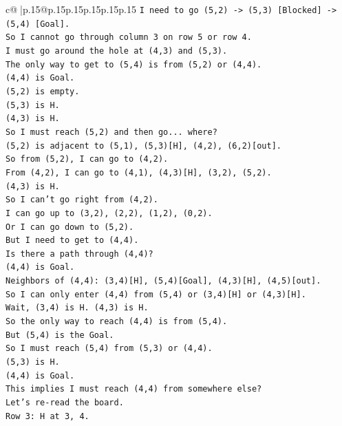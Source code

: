 \documentclass{article}
\begin{document}
{\begin{supertabular}{c@{$\;$}|p{.15\linewidth}@{}p{.15\linewidth}p{.15\linewidth}p{.15\linewidth}p{.15\linewidth}p{.15\linewidth}}
{{{\texttt{I need to go (5,2) {-}> (5,3) {[}Blocked{]} {-}> (5,4) {[}Goal{]}.} \\
\texttt{So I cannot go through column 3 on row 5 or row 4.} \\
\texttt{I must go around the hole at (4,3) and (5,3).} \\
\texttt{The only way to get to (5,4) is from (5,2) or (4,4).} \\
\texttt{(4,4) is Goal.} \\
\texttt{(5,2) is empty.} \\
\texttt{(5,3) is H.} \\
\texttt{(4,3) is H.} \\
\texttt{So I must reach (5,2) and then go... where?} \\
\texttt{(5,2) is adjacent to (5,1), (5,3){[}H{]}, (4,2), (6,2){[}out{]}.} \\
\texttt{So from (5,2), I can go to (4,2).} \\
\texttt{From (4,2), I can go to (4,1), (4,3){[}H{]}, (3,2), (5,2).} \\
\texttt{(4,3) is H.} \\
\texttt{So I can't go right from (4,2).} \\
\texttt{I can go up to (3,2), (2,2), (1,2), (0,2).} \\
\texttt{Or I can go down to (5,2).} \\
\texttt{But I need to get to (4,4).} \\
\texttt{Is there a path through (4,4)?} \\
\texttt{(4,4) is Goal.} \\
\texttt{Neighbors of (4,4): (3,4){[}H{]}, (5,4){[}Goal{]}, (4,3){[}H{]}, (4,5){[}out{]}.} \\
\texttt{So I can only enter (4,4) from (5,4) or (3,4){[}H{]} or (4,3){[}H{]}.} \\
\texttt{Wait, (3,4) is H. (4,3) is H.} \\
\texttt{So the only way to reach (4,4) is from (5,4).} \\
\texttt{But (5,4) is the Goal.} \\
\texttt{So I must reach (5,4) from (5,3) or (4,4).} \\
\texttt{(5,3) is H.} \\
\texttt{(4,4) is Goal.} \\
\texttt{This implies I must reach (4,4) from somewhere else?} \\
\texttt{Let's re{-}read the board.} \\
\texttt{Row 3: H at 3, 4.} \\
}}}
\end{supertabular}}
\end{document}
